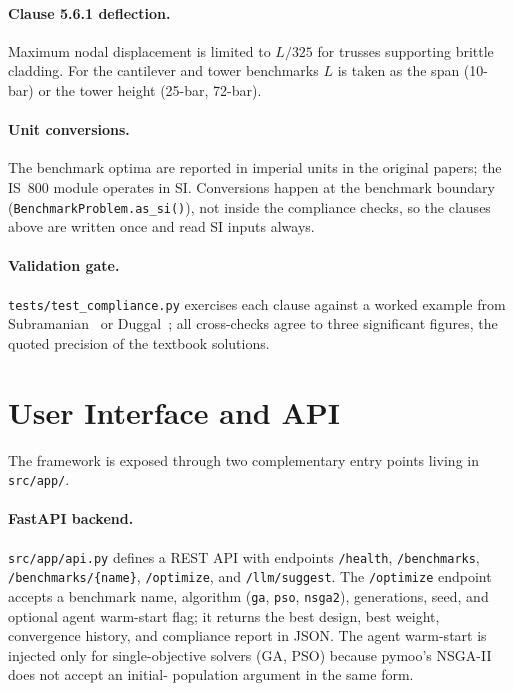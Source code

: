 \paragraph{Clause 5.6.1 deflection.} Maximum nodal displacement is
limited to $L/\num{325}$ for trusses supporting brittle cladding.
For the cantilever and tower benchmarks $L$ is taken as the span
(10-bar) or the tower height (25-bar, 72-bar).

\paragraph{Unit conversions.} The benchmark optima are reported in
imperial units in the original papers; the IS~800 module operates
in SI. Conversions happen at the benchmark boundary
(\texttt{BenchmarkProblem.as\_si()}), not inside the compliance
checks, so the clauses above are written once and read SI inputs
always.

\paragraph{Validation gate.} \texttt{tests/test\_compliance.py}
exercises each clause against a worked example from
Subramanian~\cite{subramanian2008} or
Duggal~\cite{duggal2014}; all cross-checks agree to three
significant figures, the quoted precision of the textbook
solutions.

\section{User Interface and API}
\label{sec:method:ui}

The framework is exposed through two complementary entry points
living in \texttt{src/app/}.

\paragraph{FastAPI backend.} \texttt{src/app/api.py} defines a
REST API with endpoints \texttt{/health},
\texttt{/benchmarks}, \texttt{/benchmarks/\{name\}},
\texttt{/optimize}, and \texttt{/llm/suggest}. The
\texttt{/optimize} endpoint accepts a benchmark name, algorithm
(\texttt{ga}, \texttt{pso}, \texttt{nsga2}), generations, seed, and
optional agent warm-start flag; it returns the best design, best
weight, convergence history, and compliance report in JSON. The
agent warm-start is injected only for single-objective solvers
(GA, PSO) because pymoo's NSGA-II does not accept an initial-
population argument in the same form.

